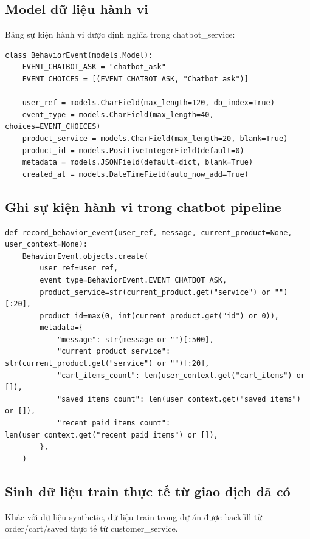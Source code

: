 \documentclass[12pt,a4paper]{article}
\begin{document}
\subsection{Model dữ liệu hành vi}
Bảng sự kiện hành vi được định nghĩa trong chatbot\_service:
\begin{lstlisting}[style=pythonstyle,caption={Model BehaviorEvent},label={lst:behavior-model}]
class BehaviorEvent(models.Model):
    EVENT_CHATBOT_ASK = "chatbot_ask"
    EVENT_CHOICES = [(EVENT_CHATBOT_ASK, "Chatbot ask")]

    user_ref = models.CharField(max_length=120, db_index=True)
    event_type = models.CharField(max_length=40, choices=EVENT_CHOICES)
    product_service = models.CharField(max_length=20, blank=True)
    product_id = models.PositiveIntegerField(default=0)
    metadata = models.JSONField(default=dict, blank=True)
    created_at = models.DateTimeField(auto_now_add=True)
\end{lstlisting}

\subsection{Ghi sự kiện hành vi trong chatbot pipeline}
\begin{lstlisting}[style=pythonstyle,caption={Hàm ghi sự kiện hành vi khi có câu hỏi chatbot},label={lst:record-behavior}]
def record_behavior_event(user_ref, message, current_product=None, user_context=None):
    BehaviorEvent.objects.create(
        user_ref=user_ref,
        event_type=BehaviorEvent.EVENT_CHATBOT_ASK,
        product_service=str(current_product.get("service") or "")[:20],
        product_id=max(0, int(current_product.get("id") or 0)),
        metadata={
            "message": str(message or "")[:500],
            "current_product_service": str(current_product.get("service") or "")[:20],
            "cart_items_count": len(user_context.get("cart_items") or []),
            "saved_items_count": len(user_context.get("saved_items") or []),
            "recent_paid_items_count": len(user_context.get("recent_paid_items") or []),
        },
    )
\end{lstlisting}

\subsection{Sinh dữ liệu train thực tế từ giao dịch đã có}
Khác với dữ liệu synthetic, dữ liệu train trong dự án được backfill từ order/cart/saved thực tế từ customer\_service.
\end{document}
